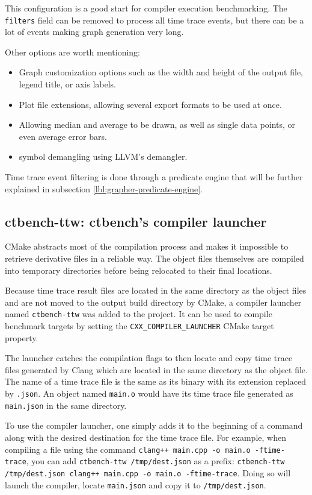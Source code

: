 \documentclass[../../main.tex]{subfiles}
\begin{document}
This configuration is a good start for compiler execution benchmarking. The
\lstinline{filters} field can be removed to process all time trace events,
but there can be a lot of events making graph generation very long.

Other options are worth mentioning:

\begin{itemize}
\item Graph customization options such as the width and height of the output
      file, legend title, or axis labels.
\item Plot file extensions, allowing several export formats to be used at once.
\item Allowing median and average to be drawn, as well as single data points,
      or even average error bars.
\item \cpp symbol demangling using LLVM's demangler.
\end{itemize}

Time trace event filtering is done through a predicate engine that will be
further explained in subsection \ref{lbl:grapher-predicate-engine}.

\subsection{ctbench-ttw: ctbench's compiler launcher}
\label{lbl:ctbench-ttw}

CMake abstracts most of the compilation process and makes it impossible to
retrieve derivative files in a reliable way. The object files themselves are
compiled into temporary directories before being relocated to their final
locations.

Because time trace result files are located in the same directory as the object
files and are not moved to the output build directory by CMake, a compiler
launcher named \lstinline{ctbench-ttw} was added to the project.
It can be used to compile benchmark targets by setting the
\lstinline{CXX_COMPILER_LAUNCHER} CMake target property.

The launcher catches the compilation flags to then locate and copy time trace
files generated by Clang which are located in the same directory as the object
file. The name of a time trace file is the same as its binary with its extension
replaced by \lstinline{.json}. An object named \lstinline{main.o} would have its
time trace file generated as \lstinline{main.json} in the same directory.

To use the compiler launcher, one simply adds it to the beginning of a command
along with the desired destination for the time trace file.
For example, when compiling a \cpp file using the command
\lstinline{clang++ main.cpp -o main.o -ftime-trace}, you can add
\lstinline{ctbench-ttw /tmp/dest.json} as a prefix:
\lstinline{ctbench-ttw /tmp/dest.json clang++ main.cpp -o main.o -ftime-trace}.
Doing so will launch the compiler, locate \lstinline{main.json} and copy it to
\lstinline{/tmp/dest.json}.
\end{document}
